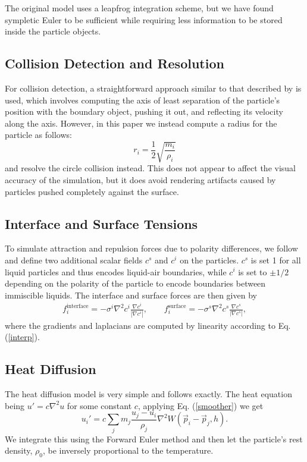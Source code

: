 \documentclass[acmtog,review]{acmart}
\begin{document}
The original model uses a leapfrog integration scheme, but we have found sympletic Euler to be sufficient while requiring less information to be stored inside the particle objects. 
\subsection{Collision Detection and Resolution}
For collision detection, a straightforward approach similar to that described by \cite{muller3} is used, which involves computing the axis of least separation of the particle's position with the boundary object, pushing it out, and reflecting its velocity along the axis. However, in this paper we instead compute a radius for the particle as follows: 
$$r_i = \frac{1}{2}\sqrt{\frac{m_i}{\rho_i}}$$
and resolve the circle collision instead. This does not appear to affect the visual accuracy of the simulation, but it does avoid rendering artifacts caused by particles pushed completely against the surface. 

\subsection{Interface and Surface Tensions}
\label{interface}
To simulate attraction and repulsion forces due to polarity differences, we follow \cite{muller5} and define two additional scalar fields $c^s$ and $c^i$ on the particles. $c^s$ is set 1 for all liquid particles and thus encodes liquid-air boundaries, while $c^i$ is set to $\pm 1/2$ depending on the polarity of the particle to encode boundaries between immiscible liquids. The interface and surface forces are then given by 
\begin{align}
  f_i^{\text{interface}} = -\sigma^i \nabla^2 c^i  \frac{\nabla c^i}{|\nabla c^i|}, \qquad f_i^{\text{surface}} = -\sigma^s \nabla^2 c^s  \frac{\nabla c^s}{|\nabla c^s|},
\end{align}
where the gradients and laplacians are computed by linearity according to Eq. (\ref{interp}).  

\subsection{Heat Diffusion}
The heat diffusion model is very simple and follows \cite{muller5} exactly. The heat equation being $u' = c \nabla^2 u$ for some constant $c$, applying Eq. (\ref{smoother}) we get 
$$u_i' = c \sum_{j} m_j \frac{u_j - u_i}{\rho_j} \nabla^2 W(\vec{p}_i - \vec{p}_j, h).$$
We integrate this using the Forward Euler method and then let the particle's rest density, $\rho_0$, be inversely proportional to the temperature.
\end{document}
